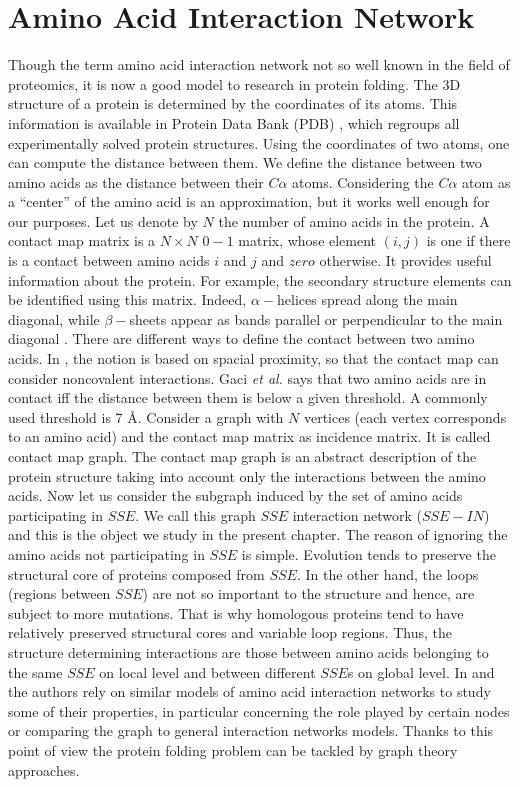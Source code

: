 \section {Amino Acid Interaction Network}
Though the term amino acid interaction network not so well known in the field of proteomics, it is now a good model to research in protein folding.
The 3D structure of a protein is determined by the coordinates of its atoms. This information is available in Protein Data Bank (PDB) \cite{berman2000protein}, which regroups all experimentally solved protein structures. Using the coordinates of two atoms, one can compute the distance between them. We define the distance between two amino acids as the distance between their $C\alpha$ atoms. Considering the $C\alpha$ atom as a “center” of the amino acid is an approximation, but it works well enough for our purposes. Let us denote by $N$ the number of amino acids in the protein. A contact map matrix is a $N \times N$ $0-1$ matrix, whose element $(i,j)$ is one if there is a contact between amino acids $i$ and $j$ and $zero$ otherwise. It provides useful information about the protein. For example, the secondary structure elements can be identified using this matrix. Indeed, $\alpha-$helices spread along the main diagonal, while $\beta-$sheets appear as bands parallel or perpendicular to the main diagonal \cite{ghosh2007dynamics}. There are different ways to define the contact between two amino acids. In \cite{gaci2009small}, the notion is based on spacial proximity, so that the contact map can consider non\textendash covalent interactions. Gaci \textit{et al.} says that two amino acids are in contact iff the distance between them is below a given threshold. A commonly used threshold is 7 \si{\angstrom}.
Consider a graph with $N$ vertices (each vertex corresponds to an amino acid) and the contact map matrix as incidence matrix. It is called contact map graph. The contact map graph is an abstract description of the protein structure taking into account only the interactions between the amino acids. Now let us consider the subgraph induced by the set of amino acids participating in $SSE$. We call this graph $SSE$ interaction network ($SSE-IN$) and this is the object we study in the present chapter. The reason of ignoring the amino acids not participating in $SSE$ is simple. Evolution tends to preserve the structural core of proteins composed from $SSE$. In the other hand, the loops (regions between $SSE$) are not so important to the structure and hence, are subject to more mutations. That is why homologous proteins tend to have relatively preserved structural cores and variable loop regions. Thus, the structure determining interactions are those between amino acids belonging to the same $SSE$ on local level and between different $SSE$s on global level. 
In \cite{muppirala2006simple} and \cite{brinda2005network} the authors rely on similar models of amino acid interaction networks to study some of their properties, in particular concerning the role played by certain nodes or comparing the graph to general interaction networks models. Thanks to this point of view the protein folding problem can be tackled by graph theory approaches.